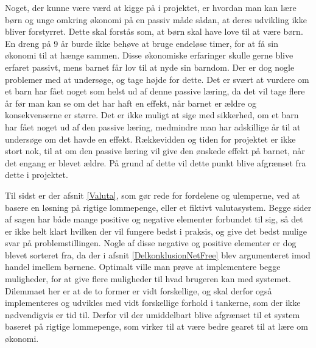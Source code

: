 Noget, der kunne være værd at kigge på i projektet, er hvordan man kan lære børn og unge omkring økonomi på en passiv måde sådan, at deres udvikling ikke bliver forstyrret. Dette skal forstås som, at børn skal have love til at være børn. En dreng på 9 år burde ikke behøve at bruge endeløse timer, for at få sin økonomi til at hænge sammen. Disse økonomiske erfaringer skulle gerne blive erfaret passivt, mens barnet får lov til at nyde sin barndom. Der er dog nogle problemer med at undersøge, og tage højde for dette. Det er svært at vurdere om et barn har fået noget som helst ud af denne passive læring, da det vil tage flere år før man kan se om det har haft en effekt, når barnet er ældre og konsekvenserne er større. Det er ikke muligt at sige med sikkerhed, om et barn har fået noget ud af den passive læring, medmindre man har adskillige år til at undersøge om det havde en effekt. Rækkevidden og tiden for projektet er ikke stort nok, til at om den passive læring vil give den ønskede effekt på barnet, når det engang er blevet ældre. På grund af dette vil dette punkt blive afgrænset fra dette i projektet.

Til sidst er der afsnit \ref{Valuta}, som gør rede for fordelene og ulemperne, ved at basere en løsning på rigtige lommepenge, eller et fiktivt valutasystem. Begge sider af sagen har både mange positive og negative elementer forbundet til sig, så det er ikke helt klart hvilken der vil fungere bedst i praksis, og give det bedst mulige svar på problemstillingen. Nogle af disse negative og positive elementer er dog blevet sorteret fra, da der i afsnit \ref{DelkonklusionNetFree} blev argumenteret imod handel imellem børnene. Optimalt ville man prøve at implementere begge muligheder, for at give flere muligheder til hvad brugeren kan med systemet. Dilemmaet her er at de to former er vidt forskellige, og skal derfor også implementeres og udvikles med vidt forskellige forhold i tankerne, som der ikke nødvendigvis er tid til. Derfor vil der umiddelbart blive afgrænset til et system baseret på rigtige lommepenge, som virker til at være bedre gearet til at lære om økonomi.
